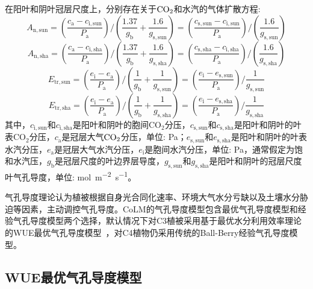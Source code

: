在阳叶和阴叶冠层尺度上，分别存在关于$\rm CO_2$和水汽的气体扩散方程:
\begin{equation}\label{A_n2_sun}
A_{\mathrm{n,sun}}=\left(\frac{c_{\mathrm{a}}-c_{\mathrm{i,sun}}}{P_{\mathrm {a}}}\right) /\left(\frac{1.37}{g_{\mathrm{b}}} +\frac{1.6}{g_{\mathrm{s,sun}}}\right)=\left(\frac{c_{\mathrm{s,sun}}-c_{\mathrm{i,sun}}}{P_{\mathrm {a}}}\right) /\left(\frac{1.6}{g_{\mathrm{s,sun}}}\right)
\end{equation}
\begin{equation}\label{A_n2_sha}
A_{\mathrm{n,sha}}=\left(\frac{c_{\mathrm{a}}-c_{\mathrm{i,sha}}}{P_{\mathrm {a}}}\right) /\left(\frac{1.37}{g_{\mathrm{b}}} +\frac{1.6}{g_{\mathrm{s,sha}}}\right)=\left(\frac{c_{\mathrm{s,sha}}-c_{\mathrm{i,sha}}}{P_{\mathrm {a}}}\right) /\left(\frac{1.6}{g_{\mathrm{s,sha}}}\right)
\end{equation}
\begin{equation}\label{ea_ei_sun}
E_{\mathrm{tr,sun}}=\left(\frac{e_{\mathrm{i}}-e_{\mathrm{a}}}{P_{\mathrm {a}}}\right) /\left(\frac{1}{g_{\mathrm{b}}}+\frac{1}{g_{\mathrm{s,sun}}}\right)=\left(\frac{e_{\mathrm{i}}-e_{\mathrm{s,sun}}}{P_{\mathrm {a}}}\right) / \frac{1}{g_{\mathrm{s,sun}}}
\end{equation}
\begin{equation}\label{ea_ei_sha}
E_{\mathrm{tr,sha}}=\left(\frac{e_{\mathrm{i}}-e_{\mathrm{a}}}{P_{\mathrm {a}}}\right) /\left(\frac{1}{g_{\mathrm{b}}}+\frac{1}{g_{\mathrm{s,sha}}}\right)=\left(\frac{e_{\mathrm{i}}-e_{\mathrm{s,sha}}}{P_{\mathrm {a}}}\right) / \frac{1}{g_{\mathrm{s,sha}}}
\end{equation}
其中，$c_{\mathrm{i,sun}}$和$c_{\mathrm{i,sha}}$是阳叶和阴叶的胞间CO$_2$分压，$c_{\mathrm{s,sun}}$和$c_{\mathrm{s,sha}}$是阳叶和阴叶的叶表CO$_2$分压，$c_{\mathrm {a}}$是冠层大气$\rm CO_2$分压，单位: Pa；$e_{\mathrm{s,sun}}$和$e_{\mathrm{s,sha}}$是阳叶和阴叶的叶表水汽分压，$e_{\mathrm {a}}$是冠层大气水汽分压，$e_{\mathrm {i}}$是胞间水汽分压，单位: Pa，通常假定为饱和水汽压，$g_{\mathrm {b}}$是冠层尺度的叶边界层导度，$g_{\mathrm{s,sun}}$和$g_{\mathrm{s,sha}}$是阳叶和阴叶的冠层尺度叶气孔导度，单位: \unit{mol.m^{-2}.s^{-1}}。

气孔导度理论认为植被根据自身光合同化速率、环境大气水分亏缺以及土壤水分胁迫等因素，主动调控气孔导度。CoLM的气孔导度模型包含最优气孔导度模型和经验气孔导度模型两个选择，默认情况下对C3植被采用基于最优水分利用效率理论的WUE最优气孔导度模型~\citep{Liang2023}，对C4植物仍采用传统的Ball-Berry经验气孔导度模型。

\subsection{WUE最优气孔导度模型}

